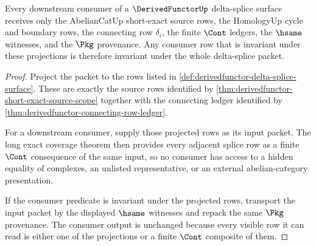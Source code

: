 \begin{theorem}\label{thm:derivedfunctor-abeliancat-homology-consumer-surface}
Every downstream consumer of a $\DerivedFunctorUp$ delta-splice surface receives only the AbelianCatUp short-exact source rows, the HomologyUp cycle and boundary rows, the connecting row $\delta_i$, the finite $\Cont$ ledgers, the $\hsame$ witnesses, and the $\Pkg$ provenance. Any consumer row that is invariant under these projections is therefore invariant under the whole delta-splice packet.
\end{theorem}
\begin{proof}
Project the packet to the rows listed in \autoref{def:derivedfunctor-delta-splice-surface}. These are exactly the source rows identified by \autoref{thm:derivedfunctor-short-exact-source-scope} together with the connecting ledger identified by \autoref{thm:derivedfunctor-connecting-row-ledger}.

For a downstream consumer, supply those projected rows as its input packet. The long exact coverage theorem then provides every adjacent splice row as a finite $\Cont$ consequence of the same input, so no consumer has access to a hidden equality of complexes, an unlisted representative, or an external abelian-category presentation.

If the consumer predicate is invariant under the projected rows, transport the input packet by the displayed $\hsame$ witnesses and repack the same $\Pkg$ provenance. The consumer output is unchanged because every visible row it can read is either one of the projections or a finite $\Cont$ composite of them.
\end{proof}

